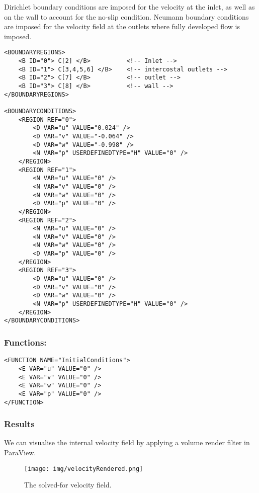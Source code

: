 Dirichlet boundary conditions are imposed for the velocity at the inlet, as well as on the wall to account for the no-slip condition. Neumann boundary conditions are imposed for the velocity field at the outlets where fully developed flow is imposed.

\begin{lstlisting}[style=XMLStyle]
<BOUNDARYREGIONS>
    <B ID="0"> C[2] </B>          <!-- Inlet -->
    <B ID="1"> C[3,4,5,6] </B>    <!-- intercostal outlets -->
    <B ID="2"> C[7] </B>          <!-- outlet -->
    <B ID="3"> C[8] </B>          <!-- wall -->
</BOUNDARYREGIONS>

<BOUNDARYCONDITIONS>
    <REGION REF="0">
        <D VAR="u" VALUE="0.024" />
        <D VAR="v" VALUE="-0.064" />
        <D VAR="w" VALUE="-0.998" />
        <N VAR="p" USERDEFINEDTYPE="H" VALUE="0" />
    </REGION>
    <REGION REF="1">
        <N VAR="u" VALUE="0" />
        <N VAR="v" VALUE="0" />
        <N VAR="w" VALUE="0" />
        <D VAR="p" VALUE="0" />
    </REGION>
    <REGION REF="2">
        <N VAR="u" VALUE="0" />
        <N VAR="v" VALUE="0" />
        <N VAR="w" VALUE="0" />
        <D VAR="p" VALUE="0" />
    </REGION>
    <REGION REF="3">
        <D VAR="u" VALUE="0" />
        <D VAR="v" VALUE="0" />
        <D VAR="w" VALUE="0" />
        <N VAR="p" USERDEFINEDTYPE="H" VALUE="0" />
    </REGION>
</BOUNDARYCONDITIONS>
\end{lstlisting}

\subsubsection{Functions:~}
\begin{lstlisting}[style=XMLStyle]
<FUNCTION NAME="InitialConditions">
    <E VAR="u" VALUE="0" />
    <E VAR="v" VALUE="0" />
    <E VAR="w" VALUE="0" />
    <E VAR="p" VALUE="0" />
</FUNCTION>
\end{lstlisting}

\subsubsection{Results}
We can visualise the internal velocity field by applying a volume render filter in ParaView.

\begin{figure}
\begin{center}
\texttt{[image: img/velocityRendered.png]}
\caption{The solved-for velocity field.}
\end{center}
\end{figure}

